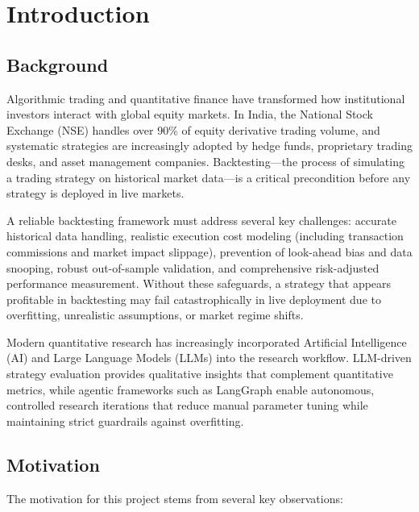 
\chapter[Introduction]{\centering Introduction}\label{chap1}
\newpage

\section{Background}

Algorithmic trading and quantitative finance have transformed how institutional investors interact with global equity markets. In India, the National Stock Exchange (NSE) handles over 90\% of equity derivative trading volume, and systematic strategies are increasingly adopted by hedge funds, proprietary trading desks, and asset management companies. Backtesting---the process of simulating a trading strategy on historical market data---is a critical precondition before any strategy is deployed in live markets.

A reliable backtesting framework must address several key challenges: accurate historical data handling, realistic execution cost modeling (including transaction commissions and market impact slippage), prevention of look-ahead bias and data snooping, robust out-of-sample validation, and comprehensive risk-adjusted performance measurement. Without these safeguards, a strategy that appears profitable in backtesting may fail catastrophically in live deployment due to overfitting, unrealistic assumptions, or market regime shifts.

Modern quantitative research has increasingly incorporated Artificial Intelligence (AI) and Large Language Models (LLMs) into the research workflow. LLM-driven strategy evaluation provides qualitative insights that complement quantitative metrics, while agentic frameworks such as LangGraph enable autonomous, controlled research iterations that reduce manual parameter tuning while maintaining strict guardrails against overfitting.

\section{Motivation}

The motivation for this project stems from several key observations:

